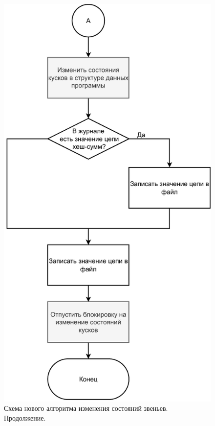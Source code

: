 \begin{figure}[hbtp]
	\centering
	\includegraphics[scale=0.7]{img/mainalgo2.pdf}
	\caption{Схема нового алгоритма изменения состояний звеньев. Продолжение.}
	\label{fig:mainalgo2}
\end{figure}

\pagebreak


